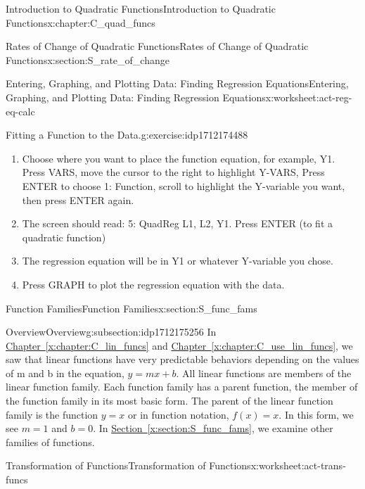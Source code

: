 \documentclass[oneside,10pt,]{book}
\newcommand{\xreffont}{\relax}
\numberwithin{equation}{chapter}
\begin{document}
\begin{chapterptx}{Introduction to Quadratic Functions}{}{Introduction to Quadratic Functions}{}{}{x:chapter:C_quad_funcs}
\begin{sectionptx}{Rates of Change of Quadratic Functions}{}{Rates of Change of Quadratic Functions}{}{}{x:section:S_rate_of_change}
\begin{worksheet-subsection}{Entering, Graphing, and Plotting Data: Finding Regression Equations}{}{Entering, Graphing, and Plotting Data: Finding Regression Equations}{}{}{x:worksheet:act-reg-eq-calc}
\begin{divisionexercise}{4}{Fitting a Function to the Data.}{}{g:exercise:idp1712174488}
\begin{enumerate}[font=\bfseries,label=(\alph*),ref=\alph*]
\item{}Choose where you want to place the function equation, for example, Y1. Press VARS, move the cursor to the right to highlight Y-VARS, Press ENTER to choose 1: Function, scroll to highlight the Y-variable you want, then press ENTER again.%
\item{}The screen should read: 5: QuadReg L1, L2, Y1. Press ENTER (to fit a quadratic function)%
\item{}The regression equation will be in Y1 or whatever Y-variable you chose.%
\item{}Press GRAPH to plot the regression equation with the data.%
\end{enumerate}
\end{divisionexercise}%
\end{worksheet-subsection}
\restoregeometry
\end{sectionptx}
%
%
\typeout{************************************************}
\typeout{************************************************}
%
\begin{sectionptx}{Function Families}{}{Function Families}{}{}{x:section:S_func_fams}
%
%
\typeout{************************************************}
\typeout{************************************************}
%
\begin{subsectionptx}{Overview}{}{Overview}{}{}{g:subsection:idp1712175256}
In \hyperref[x:chapter:C_lin_funcs]{Chapter~{\xreffont\ref{x:chapter:C_lin_funcs}}} and \hyperref[x:chapter:C_use_lin_funcs]{Chapter~{\xreffont\ref{x:chapter:C_use_lin_funcs}}}, we saw that linear functions have very predictable behaviors depending on the values of m and b in the equation, \(y = mx + b\). All linear functions are members of the linear function family. Each function family has a parent function, the member of the function family in its most basic form. The parent of the linear function family is the function \(y = x\) or in function notation, \(f(x) = x\). In this form, we see \(m = 1\) and \(b = 0\). In \hyperref[x:section:S_func_fams]{Section~{\xreffont\ref{x:section:S_func_fams}}}, we examine other families of functions.%
\end{subsectionptx}
%
%
\typeout{************************************************}
\typeout{************************************************}
%
\begin{worksheet-subsection}{Transformation of Functions}{}{Transformation of Functions}{}{}{x:worksheet:act-trans-funcs}

\end{worksheet-subsection}
\end{sectionptx}
\end{chapterptx}
\end{document}
